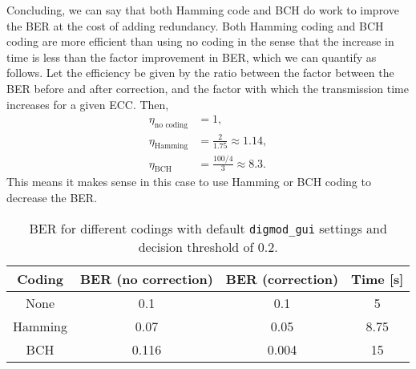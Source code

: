 \documentclass[11pt,titlepage]{report}
\begin{document}
Concluding, we can say that both Hamming code and BCH do work to improve the BER at the cost of adding redundancy. Both Hamming coding and BCH coding are more efficient than using no coding in the sense that the increase in time is less than the factor improvement in BER, which we can quantify as follows. Let the efficiency be given by the ratio between the factor between the BER before and after correction, and the factor with which the transmission time increases for a given ECC. Then,
\begin{align*}
\eta_{\text{no coding}}&=1,\\
\eta_{\text{Hamming}}&=\frac{2}{1.75}\approx1.14,\\
\eta_{\text{BCH}}&=\frac{100/4}{3}\approx8.3.
\end{align*}
This means it makes sense in this case to use Hamming or BCH coding to decrease the BER.
\begin{table}[H]
	\centering
	\caption{BER for different codings with default \texttt{digmod\_gui} settings and decision threshold of 0.2.}
	\label{tab:task4-diff-coding}
	\begin{tabular}{c c c c}
		\hline\hline
		Coding & BER (no correction) & BER (correction) & Time [s] \\
		\hline
		None & 0.1 & 0.1 & 5\\
		Hamming & 0.07 & 0.05 & 8.75 \\
		BCH & 0.116 & 0.004 & 15\\
		\hline
	\end{tabular}
\end{table}
\end{document}
